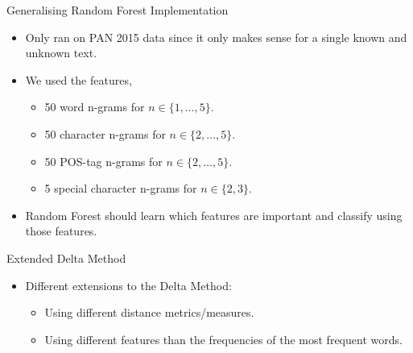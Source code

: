 \documentclass[10pt]{beamer}
\begin{document}
\begin{frame}[fragile]{Generalising Random Forest Implementation}

    \begin{itemize}
        \item Only ran on PAN 2015 data since it only makes sense for a single
            known and unknown text.
        \item We used the features,
            \begin{itemize}
                \item 50 word n-grams for $n \in \{1, \dots, 5\}$.
                \item 50 character n-grams for $n \in \{2, \dots, 5\}$.
                \item 50 POS-tag n-grams for $n \in \{2, \dots, 5\}$.
                \item 5 special character n-grams for $n \in \{2, 3\}$.
            \end{itemize}
        \item Random Forest should learn which features are important and
            classify using those features.
    \end{itemize}

\end{frame}

\begin{frame}[fragile]{Extended Delta Method}

    \begin{itemize}
        \item Different extensions to the Delta Method:
            \begin{itemize}
                \item Using different distance metrics/measures.
                \item Using different features than the frequencies of the most
                    frequent words.
            \end{itemize}
    \end{itemize}

\end{frame}
\end{document}
